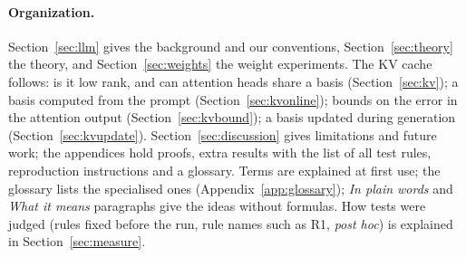 \documentclass[10pt]{article}
\theoremstyle{plain}
\theoremstyle{definition}
\theoremstyle{remark}
\newcommand{\rl}[1]{\textsf{#1}}%
\begin{document}
\paragraph{Organization.}
Section~\ref{sec:llm} gives the background and our conventions, Section~\ref{sec:theory} the theory, and Section~\ref{sec:weights} the weight experiments. The KV cache follows: is it low rank, and can attention heads share a basis (Section~\ref{sec:kv}); a basis computed from the prompt (Section~\ref{sec:kvonline}); bounds on the error in the attention output (Section~\ref{sec:kvbound}); a basis updated during generation (Section~\ref{sec:kvupdate}). Section~\ref{sec:discussion} gives limitations and future work; the appendices hold proofs, extra results with the list of all test rules, reproduction instructions and a glossary. Terms are explained at first use; the glossary lists the specialised ones (Appendix~\ref{app:glossary}); \emph{In plain words} and \emph{What it means} paragraphs give the ideas without formulas. How tests were judged (rules fixed before the run, rule names such as \rl{R1}, \emph{post hoc}) is explained in Section~\ref{sec:measure}.
\end{document}
